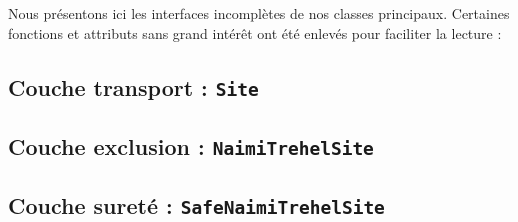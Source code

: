Nous présentons ici les interfaces incomplètes de nos classes principaux. Certaines fonctions et attributs sans grand intérêt ont été enlevés pour faciliter la lecture :

\subsection{Couche transport : \texttt{Site}}
 

\subsection{Couche exclusion : \texttt{NaimiTrehelSite}}
 

\subsection{Couche sureté : \texttt{SafeNaimiTrehelSite}}
 

